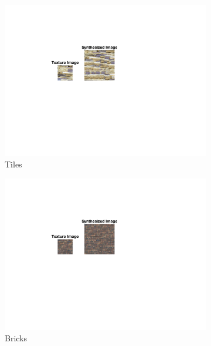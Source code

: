 \documentclass[10pt,twocolumn,letterpaper]{article}
\begin{document}
\begin{figure}
\begin{subfigure}[h]{0.33\textwidth}
       \includegraphics[trim={4.5cm 7cm 8.0cm 3cm}, clip, scale=1.5, width=\textwidth]{../results/syn_final/result_tile_B_60.png}
       \caption{Tiles}
       \label{fig:apple_res}
   \end{subfigure}
   \hfill
   \begin{subfigure}[h]{0.33\textwidth}
       \centering
       \includegraphics[trim={4.5cm 7cm 8.0cm 3cm}, clip, scale=1.5, width=\textwidth]{../results/syn_final/result_brick_B_60.png}
       \caption{Bricks}
       \label{fig:apple_res}
   \end{subfigure}
   \begin{subfigure}[h]{0.33\textwidth}
    \centering

\end{subfigure}
\end{figure}
\end{document}
